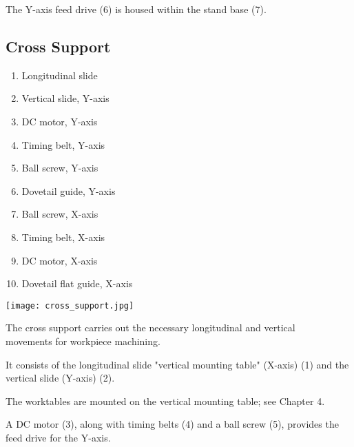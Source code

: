 \noindent The Y-axis feed drive (6) is housed within the stand base (7).

\vfill
\clearpage

\subsection{Cross Support}

\begin{minipage}{0.5\textwidth}
    \begin{enumerate}[itemsep=1pt,parsep=0pt]
        \item Longitudinal slide
        \item Vertical slide, Y-axis
        \item DC motor, Y-axis
        \item Timing belt, Y-axis
        \item Ball screw, Y-axis
        \item Dovetail guide, Y-axis
        \item Ball screw, X-axis
        \item Timing belt, X-axis
        \item DC motor, X-axis
        \item Dovetail flat guide, X-axis
    \end{enumerate}
\end{minipage}%
\begin{minipage}{0.5\textwidth}
    \centering
    \texttt{[image: cross\_support.jpg]}
    \label{fig:cross_support}
\end{minipage}

\vspace{1cm}

\noindent The cross support carries out the necessary longitudinal and vertical\\ movements for workpiece machining.

\vspace{.3cm}

\noindent It consists of the longitudinal slide "vertical mounting table" (X-axis) (1) and the vertical slide (Y-axis) (2).

\vspace{.3cm}

\noindent The worktables are mounted on the vertical mounting table; see Chapter 4.

\vspace{.3cm}

\noindent A DC motor (3), along with timing belts (4) and a ball screw (5), provides the feed drive for the Y-axis.

